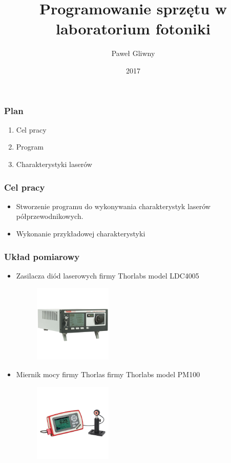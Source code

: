 \documentclass[xcolor={dvipsnames,table}]{beamer}
\title{Programowanie sprzętu w laboratorium fotoniki}
\author{Paweł Gliwny}
\institute{Instytut Fizyki \\ Politechnika Łódzka}
\date{2017}
\begin{document}
 
\frame{\titlepage}
\begin{frame}
\frametitle{Plan}
\begin{enumerate}
\item Cel pracy
\item Program 
\item Charakterystyki laserów
\end{enumerate}
\end{frame}

\begin{frame}
\frametitle{Cel pracy}
\begin{itemize}
\item Stworzenie programu do wykonywania charakterystyk laserów półprzewodnikowych.
\item Wykonanie przykładowej charakterystyki
\end{itemize}
\end{frame}

\begin{frame}
\frametitle{Układ pomiarowy}
\begin{itemize}
\item Zasilacza diód laserowych firmy Thorlabs model LDC4005 
\begin{figure}
   \includegraphics[width=0.35\textwidth,natwidth=69,natheight=87]{ldc4005.jpg}
\end{figure}
\item Miernik mocy firmy Thorlas firmy Thorlabs model PM100
\begin{figure}
   \includegraphics[width=0.35\textwidth,natwidth=69,natheight=87]{pm100.jpg}
\end{figure}
\end{itemize}
\end{frame}
\end{document}

